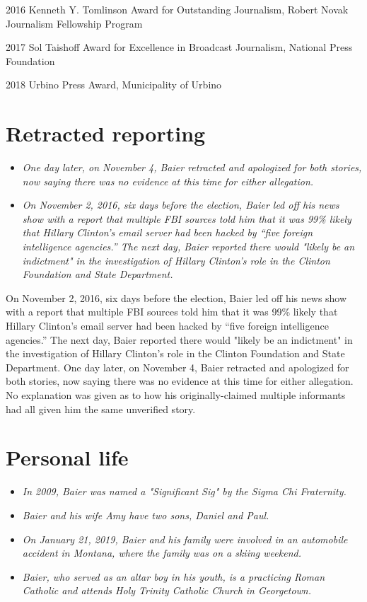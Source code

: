 2016 Kenneth Y. Tomlinson Award for Outstanding Journalism, Robert Novak
Journalism Fellowship Program

2017 Sol Taishoff Award for Excellence in Broadcast Journalism, National
Press Foundation

2018 Urbino Press Award, Municipality of Urbino

\section{Retracted reporting}\label{retracted-reporting}

\begin{itemize}
\item
  \emph{One day later, on November 4, Baier retracted and apologized for
  both stories, now saying there was no evidence at this time for either
  allegation.}
\item
  \emph{On November 2, 2016, six days before the election, Baier led off
  his news show with a report that multiple FBI sources told him that it
  was 99\% likely that Hillary Clinton's email server had been hacked by
  ``five foreign intelligence agencies.'' The next day, Baier reported
  there would "likely be an indictment" in the investigation of Hillary
  Clinton's role in the Clinton Foundation and State Department.}
\end{itemize}

On November 2, 2016, six days before the election, Baier led off his
news show with a report that multiple FBI sources told him that it was
99\% likely that Hillary Clinton's email server had been hacked by
``five foreign intelligence agencies.'' The next day, Baier reported
there would "likely be an indictment" in the investigation of Hillary
Clinton's role in the Clinton Foundation and State Department. One day
later, on November 4, Baier retracted and apologized for both stories,
now saying there was no evidence at this time for either allegation. No
explanation was given as to how his originally-claimed multiple
informants had all given him the same unverified story.

\section{Personal life}\label{personal-life}

\begin{itemize}
\item
  \emph{In 2009, Baier was named a "Significant Sig" by the Sigma Chi
  Fraternity.}
\item
  \emph{Baier and his wife Amy have two sons, Daniel and Paul.}
\item
  \emph{On January 21, 2019, Baier and his family were involved in an
  automobile accident in Montana, where the family was on a skiing
  weekend.}
\item
  \emph{Baier, who served as an altar boy in his youth, is a practicing
  Roman Catholic and attends Holy Trinity Catholic Church in
  Georgetown.}
\end{itemize}

